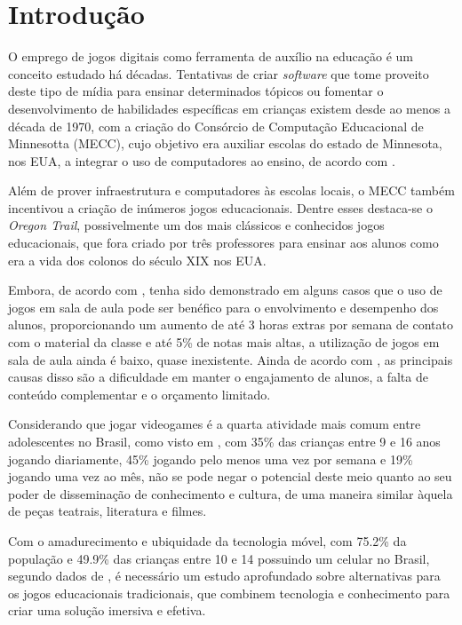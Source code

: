 \chapter{Introdução} \label{cap-introducao}

O emprego de jogos digitais como ferramenta de auxílio na 
educação é um conceito estudado há décadas. Tentativas de 
criar \textit{software} que tome proveito deste tipo de 
mídia para ensinar determinados tópicos ou fomentar o 
desenvolvimento de habilidades específicas em crianças 
existem desde ao menos a década de 1970, com a criação do 
Consórcio de Computação Educacional de Minnesotta (MECC), 
cujo objetivo era auxiliar escolas do estado de Minnesota, 
nos EUA, a integrar o uso de computadores ao ensino, de 
acordo com \cite{lussenhop:2016:oregon-trail}.

Além de prover infraestrutura e computadores às escolas 
locais, o MECC também incentivou a criação de inúmeros 
jogos educacionais. Dentre esses destaca-se o 
\textit{Oregon Trail}, possivelmente um dos mais 
clássicos e conhecidos jogos educacionais, que fora 
criado por três professores para ensinar aos alunos 
como era a vida dos colonos do século XIX nos EUA. 

Embora, de acordo com \cite{poli:2012:video-game-spore}, 
tenha sido demonstrado em alguns casos que o uso de 
jogos em sala de aula pode ser benéfico para o 
envolvimento e desempenho dos alunos, proporcionando 
um aumento de até 3 horas extras por semana de contato 
com o material da classe e até 5\% de notas mais 
altas, a utilização de jogos em sala de aula ainda 
é baixo, quase inexistente. Ainda de acordo com 
\cite{poli:2012:video-game-spore}, as principais causas 
disso são a dificuldade em manter o engajamento de 
alunos, a falta de conteúdo complementar e o orçamento 
limitado.

Considerando que jogar videogames é a quarta atividade 
mais comum entre adolescentes no Brasil, como visto em 
\cite{bndes:2014:mapeamento}, com 35\% das crianças 
entre 9 e 16 anos jogando diariamente, 45\% jogando 
pelo menos uma vez por semana e 19\% jogando uma vez 
ao mês, não se pode negar o potencial deste meio quanto 
ao seu poder de disseminação de conhecimento e cultura, 
de uma maneira similar àquela de peças teatrais, 
literatura e filmes.

Com o amadurecimento e ubiquidade da tecnologia móvel, 
com 75.2\% da população e 49.9\% das crianças entre 10 
e 14 possuindo um celular no Brasil, segundo dados de 
\cite{IBGE:2015:PNAD_TIC_2013}, é necessário um estudo 
aprofundado sobre alternativas para os jogos educacionais 
tradicionais, que combinem tecnologia e conhecimento 
para criar uma solução imersiva e efetiva.

